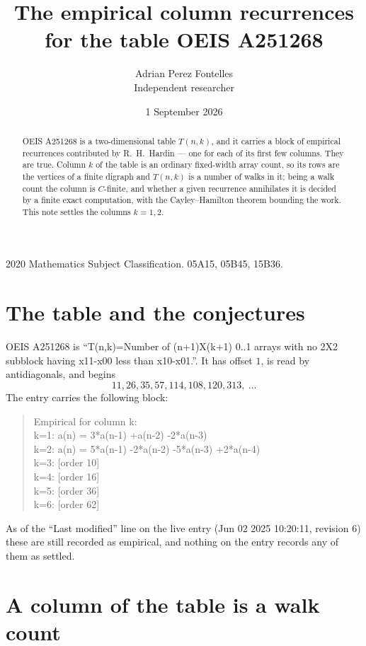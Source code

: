 \documentclass[11pt,a4paper]{article}
\title{The empirical column recurrences for the table OEIS A251268}
\author{Adrian Perez Fontelles\\ \small Independent researcher}
\date{1 September 2026}
\theoremstyle{plain}
\theoremstyle{definition}
\begin{document}
\maketitle

\begin{abstract}
OEIS A251268 is a two-dimensional table $T(n,k)$, and it carries a block of empirical
recurrences contributed by R.~H.~Hardin --- one for each of its first few columns. They are
true. Column $k$ of the table is an ordinary fixed-width array count, so its rows are the
vertices of a finite digraph and $T(n,k)$ is a number of walks in it; being a walk count the
column is $C$-finite, and whether a given recurrence annihilates it is decided by a finite
exact computation, with the Cayley--Hamilton theorem bounding the work. This note settles the columns $k=1, 2$.
\end{abstract}

\noindent\small 2020 Mathematics Subject Classification. 05A15, 05B45, 15B36.\normalsize

\section{The table and the conjectures}

OEIS A251268 is ``T(n,k)=Number of (n+1)X(k+1) 0..1 arrays with no 2X2 subblock having x11-x00 less than x10-x01.''. It has offset $1$, is
read by antidiagonals, and begins
\[
11, 26, 35, 57, 114, 108, 120, 313,\ \dots
\]
The entry carries the following block:
\begin{quote}\small
Empirical for column k:\\
k=1: a(n) = 3*a(n-1) +a(n-2) -2*a(n-3)\\
k=2: a(n) = 5*a(n-1) -2*a(n-2) -5*a(n-3) +2*a(n-4)\\
k=3: [order 10]\\
k=4: [order 16]\\
k=5: [order 36]\\
k=6: [order 62]\\
\end{quote}
As of the ``Last modified'' line on the live entry (Jun 02 2025 10:20:11, revision 6) these are still
recorded as empirical, and nothing on the entry records any of them as settled.

\section{A column of the table is a walk count}
\end{document}
